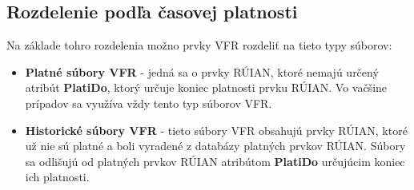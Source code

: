 \subsection {Rozdelenie podľa časovej platnosti}
Na základe tohro rozdelenia možno prvky VFR rozdeliť na tieto typy súborov: 
\begin{itemize}
    \item {{\bf Platné súbory VFR} - jedná sa o prvky RÚIAN, ktoré nemajú určený atribút {\bf PlatiDo}, ktorý určuje koniec platnosti prvku RÚIAN. Vo vačšine prípadov sa využíva vždy tento typ súborov VFR.}
    \item{{\bf Historické súbory VFR} - tieto súbory VFR obsahujú prvky RÚIAN, ktoré už nie sú platné a boli vyradené z databázy platných prvkov RÚIAN. Súbory sa odlišujú od platných prvkov RÚIAN atribútom {\bf PlatiDo} určujúcim koniec ich platnosti}. 
\end{itemize}

